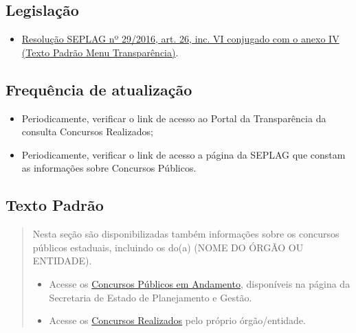 \documentclass[]{book}
\providecommand{\tightlist}{%
  \setlength{\itemsep}{0pt}\setlength{\parskip}{0pt}}
\begin{document}
\hypertarget{legislauxe7uxe3o-9}{%
\subsection{Legislação}\label{legislauxe7uxe3o-9}}

\begin{itemize}
\tightlist
\item
  \href{http://www.planejamento.mg.gov.br/sites/default/files/documentos/resolucao_sitios_seplag_29_de_05_07_2016_1.pdf}{Resolução SEPLAG nº 29/2016, art. 26, inc. VI conjugado com o anexo IV (Texto Padrão Menu Transparência)}.
\end{itemize}

\hypertarget{frequuxeancia-de-atualizauxe7uxe3o-8}{%
\subsection{Frequência de atualização}\label{frequuxeancia-de-atualizauxe7uxe3o-8}}

\begin{itemize}
\tightlist
\item
  Periodicamente, verificar o link de acesso ao Portal da Transparência da consulta Concursos Realizados;
\item
  Periodicamente, verificar o link de acesso a página da SEPLAG que constam as informações sobre Concursos Públicos.
\end{itemize}

\hypertarget{texto-padruxe3o-9}{%
\subsection{Texto Padrão}\label{texto-padruxe3o-9}}

\begin{quote}
Nesta seção são disponibilizadas também informações sobre os concursos públicos estaduais, incluindo os do(a) (NOME DO ÓRGÃO OU ENTIDADE).

\begin{itemize}
\item
  Acesse os \href{http://www.planejamento.mg.gov.br/concursos-e-estagios/concursos-publicos}{Concursos Públicos em Andamento}, disponíveis na página da Secretaria de Estado de Planejamento e Gestão.
\item
  Acesse os \href{http://www.transparencia.mg.gov.br/estado-pessoal/concursos-realizados}{Concursos Realizados} pelo próprio órgão/entidade.
\end{itemize}
\end{quote}
\end{document}
